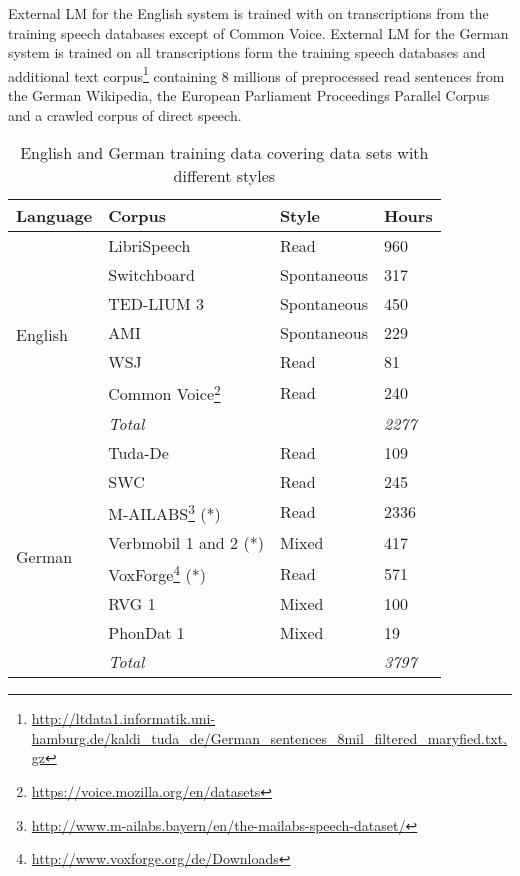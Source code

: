 \documentclass[12pt,a4paper]{article}
\begin{document}
External LM for the English system is trained with on transcriptions from the training speech databases
except of Common Voice. External LM for the German system is trained on all transcriptions
form the training speech databases and additional text
corpus\footnote{\url{http://ltdata1.informatik.uni-hamburg.de/kaldi_tuda_de/German_sentences_8mil_filtered_maryfied.txt.gz}}
containing 8 millions of preprocessed read sentences
from the German Wikipedia, the European Parliament Proceedings Parallel Corpus and a crawled corpus of direct speech.

\begin{savenotes}
\begin{table}[H]
 \centering
 \caption{English and German training data covering data sets with different styles}
  \footnotesize
  \begin{tabular}{|l|l|l|l|}
    \hline
    \textbf{Language} & \textbf{Corpus} & \textbf{Style} & \textbf{Hours} \\
    \hline
    \multirow[t]{7}{*}{English} & LibriSpeech \cite{panayotov2015librispeech} & Read & 960 \\
    \cline{2-4}
    & Switchboard \cite{godfrey1992switchboard} & Spontaneous & 317 \\
    \cline{2-4}
    & TED-LIUM 3 \cite{hernandez2018ted} & Spontaneous & 450 \\
    \cline{2-4}
    & AMI \cite{carletta2007unleashing} & Spontaneous & 229 \\
    \cline{2-4}
    & WSJ \cite{paul1992design} & Read & 81 \\
    \cline{2-4}
    & Common Voice\footnote{\url{https://voice.mozilla.org/en/datasets}} & Read & 240 \\
    \cline{2-4}
    & \textit{Total} & & \textit{2277} \\
    \hline
    \multirow[t]{8}{*}{German} & Tuda-De \cite{radeck2015open} & Read & 109 \\
    \cline{2-4}
    & SWC \cite{kohn2016mining} & Read & 245 \\
    \cline{2-4}
    & M-AILABS\footnote{\url{http://www.m-ailabs.bayern/en/the-mailabs-speech-dataset/}} (*) & Read & 2336 \\
    \cline{2-4}
    & Verbmobil 1 and 2 \cite{wahlster2013verbmobil} (*) & Mixed & 417 \\
    \cline{2-4}
    & VoxForge\footnote{\url{http://www.voxforge.org/de/Downloads}} (*) & Read & 571 \\
    \cline{2-4}
    & RVG 1 \cite{burger1998rvg} & Mixed & 100 \\
    \cline{2-4}
    & PhonDat 1 \cite{hess1995phondat} & Mixed & 19 \\
    \cline{2-4}
    & \textit{Total} & & \textit{3797} \\
    \hline
  \end{tabular}
  \label{tab:data}
\end{table}
\end{savenotes}
\end{document}
